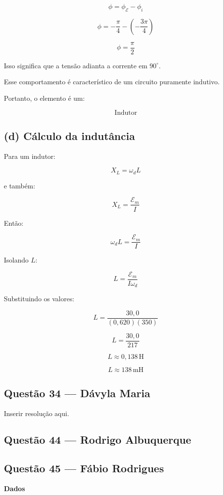 \documentclass[12pt,a4paper]{article}
\begin{document}
\[
\phi=\phi_{\mathcal{E}}-\phi_i
\]

\[
\phi=
-\frac{\pi}{4}
-
\left(
-\frac{3\pi}{4}
\right)
\]

\[
\phi=\frac{\pi}{2}
\]

Isso significa que a tensão adianta a corrente em $90^\circ$.

Esse comportamento é característico de um circuito puramente indutivo.

Portanto, o elemento é um:

\[
\boxed{\text{Indutor}}
\]


\subsection*{(d) Cálculo da indutância}

Para um indutor:

\[
X_L=\omega_d L
\]

e também:

\[
X_L=\frac{\mathcal{E}_m}{I}
\]

Então:

\[
\omega_d L = \frac{\mathcal{E}_m}{I}
\]

Isolando $L$:

\[
L=\frac{\mathcal{E}_m}{I\omega_d}
\]

Substituindo os valores:

\[
L=
\frac{30,0}
{(0,620)(350)}
\]

\[
L=
\frac{30,0}{217}
\]

\[
L\approx 0,138\,\text{H}
\]

\[
\boxed{L\approx 138\,\text{mH}}
\]



\subsection{Questão 34 — Dávyla Maria}
Inserir resolução aqui.

\subsection{Questão 44 — Rodrigo Albuquerque}





\subsection{Questão 45 — Fábio Rodrigues}
\textbf{Dados}
\end{document}

